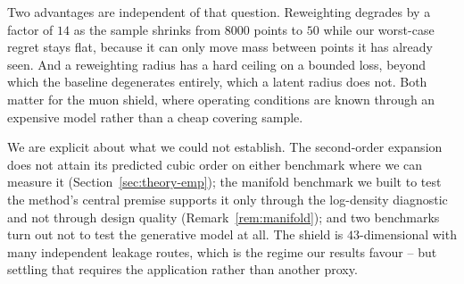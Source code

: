 \documentclass[11pt]{article}
\begin{document}
Two advantages are independent of that question. Reweighting degrades by a factor of $14$ as
the sample shrinks from $8000$ points to $50$ while our worst-case regret stays flat, because
it can only move mass between points it has already seen. And a reweighting radius has a hard
ceiling on a bounded loss, beyond which the baseline degenerates entirely, which a latent
radius does not. Both matter for the muon shield, where operating conditions are known
through an expensive model rather than a cheap covering sample.

We are explicit about what we could not establish. The second-order expansion does not attain
its predicted cubic order on either benchmark where we can measure it
(Section~\ref{sec:theory-emp}); the manifold benchmark we built to test the
method's central premise supports it only through the log-density diagnostic and not through
design quality (Remark~\ref{rem:manifold}); and two benchmarks turn out not to test the
generative model at all. The shield is $43$-dimensional with many independent leakage routes,
which is the regime our results favour -- but settling that requires the application rather
than another proxy.


 
\end{document}
